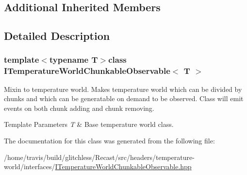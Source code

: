 \subsection*{Additional Inherited Members}


\subsection{Detailed Description}
\subsubsection*{template$<$typename T$>$class I\-Temperature\-World\-Chunkable\-Observable$<$ T $>$}

Mixin to temperature world. Makes temperature world which can be divided by chunks and which can be generatable on demand to be observed. Class will emit events on both chunk adding and chunk removing.


\begin{DoxyTemplParams}{Template Parameters}
{\em T} & Base temperature world class. \\
\hline
\end{DoxyTemplParams}


The documentation for this class was generated from the following file\-:\begin{DoxyCompactItemize}
\item 
/home/travis/build/glitchless/\-Recast/src/headers/temperature-\/world/interfaces/\hyperlink{_i_temperature_world_chunkable_observable_8hpp}{I\-Temperature\-World\-Chunkable\-Observable.\-hpp}\end{DoxyCompactItemize}
